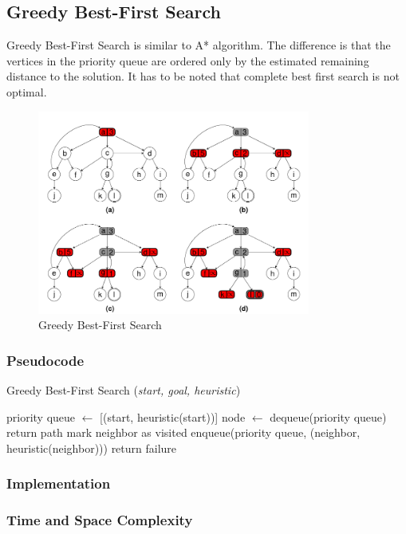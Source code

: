 \subsection{Greedy Best-First Search}
\noindent Greedy Best-First Search is similar to A* algorithm. The difference is that the vertices in the priority queue are ordered only by the estimated remaining distance to the solution. It has to be noted that complete best first search is not optimal.

\begin{figure}[H]
	\centering
	\includegraphics[width=0.8\textwidth]{./imgs/gbfs.png}
	\caption{Greedy Best-First Search}
	\label{fig:GBFS}
\end{figure}

\subsubsection{Pseudocode}
\begin{algorithm}[H]
	\caption{Greedy Best-First Search (\textit{start, goal, heuristic})}
	\label{alg:gbfs}
	\begin{algorithmic}[1]
		\State priority queue \(\gets\) [(start, heuristic(start))]
		\State node \(\gets\) dequeue(priority queue)
		\State return path
		\EndIf
		\State mark neighbor as visited
		\State enqueue(priority queue, (neighbor, heuristic(neighbor)))
		\EndIf
		\EndFor
		\EndWhile
		\State return failure
	\end{algorithmic}
\end{algorithm}

\subsubsection{Implementation}

\subsubsection{Time and Space Complexity}

